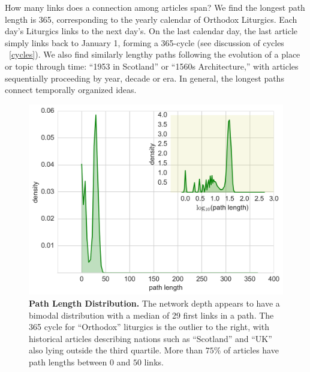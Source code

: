 \documentclass[pre,twocolumn,twoside,byrevtex,superscriptaddress,floatfix]{revtex4-1}
\begin{document}
How many links does a connection among articles span? 
We find the longest path length is 365,
corresponding to the yearly calendar of Orthodox Liturgics.
Each day's Liturgics links to the next day's. On the last calendar day, the last article simply links back to January 1, forming a 365-cycle 
(see discussion of cycles ~\ref{cycles}).
We also find similarly lengthy paths following the evolution of a place or topic through time: 
``1953 in Scotland'' or ``1560s Architecture,'' with articles sequentially proceeding by year, decade or era.
In general, the longest paths connect temporally organized ideas.

\begin{figure}[tp!]
  \includegraphics[width=\columnwidth]{../graphics/path_lengths_dist.png}
  \caption{
    \textbf{Path Length Distribution.}
The network depth appears to have a bimodal distribution with a median of 29 first links in a path.
The 365 cycle for ``Orthodox'' liturgics is the outlier to the right, with historical articles 
describing nations such as ``Scotland'' and ``UK'' also lying outside the third quartile.
More than $75\%$ of articles have path lengths between 
$0$ and $50$ links.}
  \label{fig:Path Length Distribution}
\end{figure}
\end{document}
